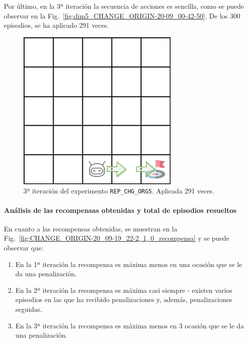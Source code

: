 Por último, en la 3ª iteración la secuencia de acciones es sencilla, como se puede observar en la  Fig.~\ref{fig:dim5_CHANGE_ORIGIN-20-09_00-42-50}. De los 300 episodios, se ha aplicado 291 veces.

\begin{figure}
    \centering
    \includegraphics[scale=0.4]{cap5_experimentacion/images/dim5_CHANGE_ORIGIN-20-09_00-42-50.png}
    \caption{3ª iteración del experimento \texttt{REP\_CHG\_ORG5}. Aplicada 291 veces.}
    \label{fig:dim5_CHANGE_ORIGIN-20_09-00_52-2, 1, 0_3iter}
\end{figure}


\paragraph{Análisis de las recompensas obtenidas y total de episodios resueltos} 

En cuanto a las recompensas obtenidas, se muestran en la Fig.~\ref{fig:CHANGE_ORIGIN-20_09-19_22-2, 1, 0_recompensa} y se puede observar que: 
\begin{enumerate}
    \item En la 1ª iteración la recompensa es máxima menos en una ocasión que se le da una penalización.
    \item En la 2ª iteración la recompensa es máxima casi siempre - existen varios episodios en las que ha recibido penalizaciones y, además, penalizaciones seguidas.
    \item En la 3ª iteración la recompensa es máxima menos en 3 ocasión que se le da una penalización.
\end{enumerate}

